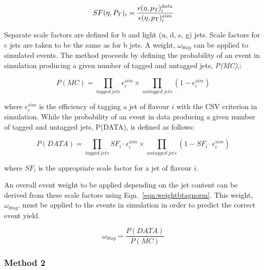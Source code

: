 \begin{centering}
\begin{equation}
SF(\eta, P_{T})_{i} = \frac{\epsilon(\eta , p_{\mathrm{T}})^{data}_{i}}{\epsilon(\eta , p_{\mathrm{T}})^{sim}_{i}}
\label{eqn:sfbtagnorm}
\end{equation}
\end{centering}
Separate scale factors are defined for b and light (u, d, s, g) jets. Scale factors for c jets are taken to be the same as for b jets. A weight, $\omega_{btag}$ can be applied to simulated events. The method proceeds by defining the probability of an event in simulation producing a given number of tagged and untagged jets, \emph{P(MC)},:

\begin{centering}
\begin{equation}
P(MC) = \prod_{tagged~jets}\epsilon^{sim}_{i} \times \prod_{untagged~jets}(1- \epsilon^{sim}_{i})
\end{equation}
\end{centering}
where $\epsilon^{sim}_{i}$ is the efficiency of tagging a jet of flavour $i$ with the CSV criterion in simulation. While the probability of an event in data producing a given number of tagged and untagged jets, P(DATA), is defined as follows:


\begin{centering}
\begin{equation}
P(DATA) = \prod_{tagged~jets}SF_{i}\cdot\epsilon^{sim}_{i} \times \prod_{untagged~jets}(1- SF_{i}\cdot\epsilon^{sim}_{i})
\end{equation}
\end{centering}
where $SF_{i}$ is the appropriate scale factor for a jet of flavour $i$. 

An overall event weight to be applied depending on the jet content can be derived from these scale factors using Eqn.~\ref{eqn:weightbtagnorm}. This weight, $\omega_{btag}$, must be applied to the events in simulation in order to predict the correct event yield.

\begin{centering}
\begin{equation}
 \omega_{btag} = \frac{P(DATA)}{P(MC)}
 \label{eqn:weightbtagnorm}
\end{equation}
\end{centering}

\subsubsection{Method 2 ~\label{subsec:method2btag}}


